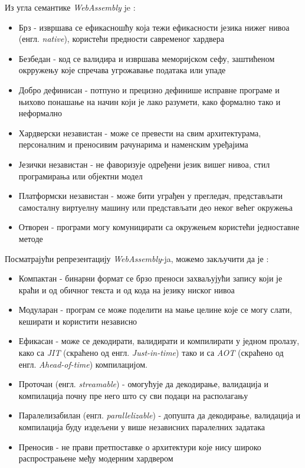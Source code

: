 \documentclass[12pt,oneside]{memoir}
\begin{document}
Из угла семантике \textit{WebAssembly} je \cite{WASMS}:

\begin{itemize}
	\item Брз - извршава се ефикасношћу која тежи ефикасности језика нижег нивоа (енгл. \textit{native}), користећи
	предности савременог хардвера
	\item Безбедан - код се валидира и извршава меморијском сефу, заштићеном окрружењу које спречава угрожавање
	података или упаде
	\item Добро дефинисан - потпуно и прецизно дефинише исправне програме и њихово понашање на начин који је лако
	разумети, како формално тако и неформално
	\item Хардверски независтан - може се превести на свим архитектурама, персоналним и преносивим рачунарима и
	наменским уређајима
	\item Језички независтан - не фаворизује одређени језик вишег нивоа, стил програмирања или објектни модел
	\item Платформски независтан - може бити уграђен у прегледач, представљати самосталну виртуелну машину или
	представљати део неког већег окружења
	\item Отворен - програми могу комуницирати са окружењем користећи једноставне методе
\end{itemize}
Посматрајући репрезентацију \textit{WebAssembly}-ja, можемо закључити да је \cite{WASMS}:

\begin{itemize}
	\item Компактан - бинарни формат се брзо преноси захваљујући запису који је краћи и од обичног текста и од кода
	на језику ниског нивоа
	\item Модуларан - програм се може поделити на мање целине које се могу слати, кеширати и користити независно
	\item Ефикасан - може се декодирати, валидирати и компилирати у једном пролазу, како са \textit{JIT} (скраћено
	од 
	енгл. \textit{Just-in-time}) тако и са \textit{AOT} (скраћено од енгл. \textit{Ahead-of-time}) компилацијом.
	\item Проточан (енгл. \textit{streamable}) - омогућује да декодирање, валидација и компилација почну пре него
	што
	су сви подаци на располагању
	\item Паралелизабилан (енгл. \textit{parallelizable}) - допушта да декодирање, валидација и компилација буду
	издељени у више независних паралелних задатака
	\item Преносив - не прави претпоставке о архитектури које нису широко распрострањене међу модерним хардвером
\end{itemize}
\end{document}
